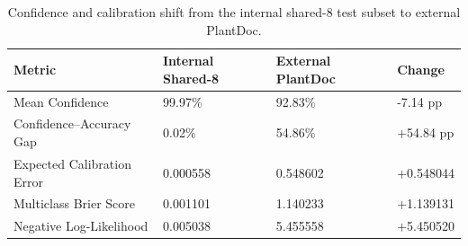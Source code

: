 \begin{table}
\caption{Confidence and calibration shift from the internal shared-8 test subset to external PlantDoc.}
\label{tab:calibration_shift}
\begin{tabular}{llll}
\toprule
Metric & Internal Shared-8 & External PlantDoc & Change \\
\midrule
Mean Confidence & 99.97\% & 92.83\% & -7.14 pp \\
Confidence–Accuracy Gap & 0.02\% & 54.86\% & +54.84 pp \\
Expected Calibration Error & 0.000558 & 0.548602 & +0.548044 \\
Multiclass Brier Score & 0.001101 & 1.140233 & +1.139131 \\
Negative Log-Likelihood & 0.005038 & 5.455558 & +5.450520 \\
\bottomrule
\end{tabular}
\end{table}
